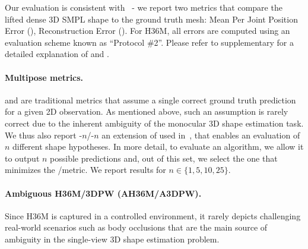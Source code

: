 Our evaluation is consistent with~\cite{kolotouros19learning,kolotouros19convolutional} - we report two metrics that compare the lifted dense 3D SMPL shape to the ground truth mesh: Mean Per Joint Position Error (\textbf{\MPJPE}), Reconstruction Error (\textbf{\RE}). 
For H36M, all errors are computed using an evaluation scheme known as ``Protocol \#2''. Please refer to supplementary for a detailed explanation of \MPJPE and \RE.



\paragraph{Multipose metrics.}

\MPJPE and \RE are traditional metrics that assume a single correct ground truth prediction for a given 2D observation.
As mentioned above, such an assumption is rarely correct due to the inherent ambiguity of the monocular 3D shape estimation task.
We thus also report \MPJPE-$n$/\RE-$n$ an extension of \MPJPE\RE used in~\cite{li19generating}, that enables an evaluation of $n$ different shape hypotheses.
In more detail, to evaluate an algorithm, we allow it to output $n$ possible predictions and, out of this set, we select the one that minimizes the \MPJPE/\RE metric.
We report results for $n\in \{1,5,10,25\}$.

\paragraph{Ambiguous H36M/3DPW (AH36M/A3DPW).}
Since H36M is captured in a controlled environment, it rarely depicts challenging real-world scenarios such as body occlusions that are the main source of ambiguity in the single-view 3D shape estimation problem.

